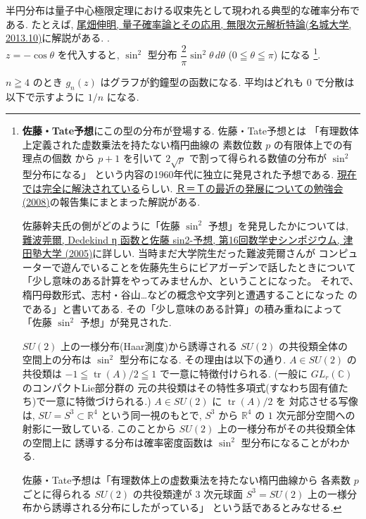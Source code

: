 \documentclass[12pt,twoside]{jarticle}
\newcommand\R{{\mathbb R}} %
\newcommand\C{{\mathbb C}} %
\theoremstyle{jplain}
\theoremstyle{jplain}
\theoremstyle{jplain}
\numberwithin{theorem}{section}
\numberwithin{equation}{section}
\numberwithin{figure}{section}
\numberwithin{table}{section}
\begin{document}
\begin{itemize}
{半円分布は量子中心極限定理における収束先として現われる典型的な確率分布である.
たとえば, 
\href{http://www.math.is.tohoku.ac.jp/~obata/student/graduate/file/2013-Meijo-QP-Graph.pdf}
{尾畑伸明, 量子確率論とその応用, 無限次元解析特論(名城大学, 2013.10)}に解説がある.
}.
\\
$z=-\cos\theta$ を代入すると, $\sin^2$ 型分布 
$\dfrac{2}{\pi}\sin^2\theta\,d\theta$ ($0\leqq\theta\leqq\pi$) になる%
\footnote{\label{fn:Sato-Tate}%
{\bf 佐藤・Tate予想}にこの型の分布が登場する.
佐藤・Tate予想とは
「有理数体上定義された虚数乗法を持たない楕円曲線の
素数位数 $p$ の有限体上での有理点の個数
から $p+1$ を引いて $2\sqrt{p}$ で割って得られる数値の分布が $\sin^2$ 型分布になる」
という内容の1960年代に独立に発見された予想である.
\href{http://www.math.ias.edu/~rtaylor/}{現在では完全に解決されている}らしい.
\href{http://www.kurims.kyoto-u.ac.jp/~gokun/R=T.html}
{Ｒ＝Ｔの最近の発展についての勉強会(2008)}の報告集にまとまった解説がある.

佐藤幹夫氏の側がどのように「佐藤 $\sin^2$ 予想」を発見したかについては, 
\href{http://www2.tsuda.ac.jp/suukeiken/math/suugakushi/sympo16/16_8nanba.pdf}
{難波莞爾, Dedekind η 函数と佐藤 sin2-予想, 第16回数学史シンポジウム, 
津田塾大学 (2005)}に詳しい. 当時まだ大学院生だった難波莞爾さんが
コンピューターで遊んでいることを佐藤先生らにビアガーデンで話したときについて
「少し意味のある計算をやってみませんか、ということになった。
それで、楕円母数形式、志村・谷山…などの概念や文字列と遭遇することになった
のである」と書いてある. その「少し意味のある計算」の積み重ねによって
「佐藤 $\sin^2$ 予想」が発見された.

$SU(2)$ 上の一様分布(Haar測度)から誘導される $SU(2)$ の共役類全体の
空間上の分布は $\sin^2$ 型分布になる. その理由は以下の通り.
$A\in SU(2)$ の共役類は $-1\leqq\operatorname{tr}(A)/2\leqq 1$
で一意に特徴付けられる. (一般に $GL_r(\C)$ のコンパクトLie部分群の
元の共役類はその特性多項式(すなわち固有値たち)で一意に特徴づけられる.)
$A\in SU(2)$ に $\operatorname{tr}(A)/2$ を
対応させる写像は, $SU=S^3\subset\R^4$ という同一視のもとで, 
$S^3$ から $\R^4$ の $1$ 次元部分空間への射影に一致している.
このことから $SU(2)$ 上の一様分布がその共役類全体の空間上に
誘導する分布は確率密度函数は $\sin^2$ 型分布になることがわかる.

佐藤・Tate予想は「有理数体上の虚数乗法を持たない楕円曲線から
各素数 $p$ ごとに得られる $SU(2)$ の共役類達が 
$3$ 次元球面 $S^3=SU(2)$ 上の一様分布から誘導される分布にしたがっている」
という話であるとみなせる.
}.

\end{itemize}
$n\geqq 4$ のとき $g_n(z)$ はグラフが釣鐘型の函数になる.
平均はどれも $0$ で分散は以下で示すように $1/n$ になる.
\end{document}

